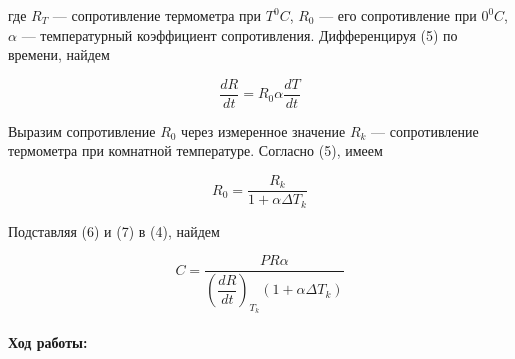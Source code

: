 \documentclass[12pt,a4paper]{article}
\begin{document}
	где $R_T$ — сопротивление термометра при $T^0 C$, $R_0$ — его сопротивление при $0^0 C$, $\alpha$ — температурный коэффициент сопротивления. Дифференцируя (5) по времени, найдем
	
	\begin{equation}
		\dfrac{dR}{dt} = R_0 \alpha \dfrac{dT}{dt}
	\end{equation}
	
	Выразим сопротивление $R_0$ через измеренное значение $R_k$ — сопротивление термометра при комнатной температуре. Согласно (5), имеем
	
	\begin{equation}
		R_0 = \dfrac{R_k}{1 + \alpha \Delta T_k}
	\end{equation}
	
	Подставляя (6) и (7) в (4), найдем
	
	\begin{equation}
		C = \dfrac{PR \alpha}{\left( \dfrac{dR}{dt} \right)_{T_k} (1 + \alpha \Delta T_k)}
	\end{equation}
	
	\newpage	
	
	\paragraph* {Ход работы:}
	
\end{document}
